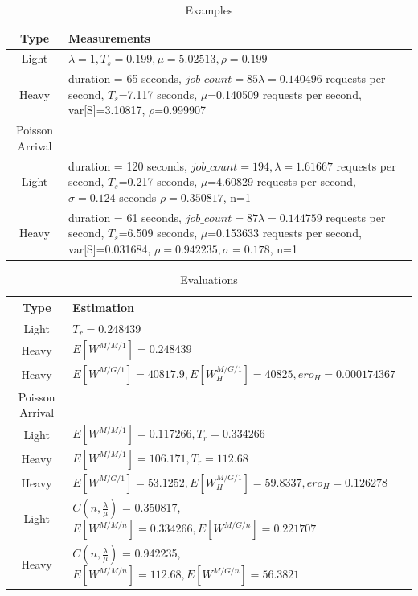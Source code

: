 \begin{center}
\begin{longtable}{c p{100mm}}
\caption{Examples} \\
\hline
Type & Measurements \\
\hline
Light & $\lambda=1, T_{s}=0.199, \mu=5.02513, \rho=0.199$\\
Heavy & duration = 65 seconds, $job{\_}count = 85 \lambda=0.140496$ requests per second, $T_{s}$=7.117 seconds, $\mu$=0.140509 requests per second, var[S]=3.10817, $\rho$=0.999907\\
\hline
Poisson Arrival\\
\hline
Light & duration = 120 seconds, $job{\_}count = 194, \lambda=1.61667$ requests per second, $T_{s}$=0.217 seconds, $\mu$=4.60829 requests per second, $\sigma = 0.124$ seconds $\rho=0.350817$, n=1\\
Heavy & duration = 61 seconds, $job{\_}count = 87 \lambda=0.144759$ requests per second, $T_{s}$=6.509 seconds, $\mu$=0.153633 requests per second, var[S]=0.031684, $\rho=0.942235, \sigma=0.178$, n=1\\
\hline
\end{longtable}
\end{center}

\begin{center}
\begin{longtable}{c p{100mm}}
\caption{Evaluations} \\
\hline
Type & Estimation \\
\hline
Light & $T_{r} = 0.248439$\\
Heavy & $E[W^{M/M/1}] = 0.248439$\\
Heavy & $E[W^{M/G/1}] = 40817.9, E[W_{H}^{M/G/1}]=40825, ero_{H}=0.000174367$\\
\hline
Poisson Arrival\\
\hline
Light & $E[W^{M/M/1}] = 0.117266, T_{r} = 0.334266$\\
Heavy & $E[W^{M/M/1}] = 106.171, T_{r} = 112.68$\\
Heavy & $E[W^{M/G/1}] = 53.1252, E[W_{H}^{M/G/1}]=59.8337, ero_{H}=0.126278$\\
Light & $C(n,\frac{\lambda}{\mu})$ = 0.350817, $E[W^{M/M/n}] = 0.334266, E[W^{M/G/n}]=0.221707$\\
Heavy & $C(n,\frac{\lambda}{\mu})$ = 0.942235, $E[W^{M/M/n}] = 112.68, E[W^{M/G/n}]=56.3821$\\
\hline
\end{longtable}
\end{center}


